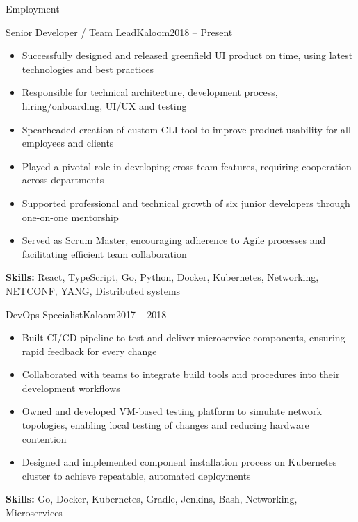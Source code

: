 \documentclass[]{cv}
\begin{document}
	\makeheader

	\begin{cvsection}{Employment}
		\begin{cvsubsection}{Senior Developer / Team Lead}{Kaloom}{2018 -- Present}
			\begin{itemize}
				\item Successfully designed and released greenfield UI product on time, using latest technologies and best practices
				\item Responsible for technical architecture, development process, hiring/onboarding, UI/UX and testing
				\item Spearheaded creation of custom CLI tool to improve product usability for all employees and clients
				\item Played a pivotal role in developing cross-team features, requiring cooperation across departments
				\item Supported professional and technical growth of six junior developers through one-on-one mentorship
				\item Served as Scrum Master, encouraging adherence to Agile processes and facilitating efficient team collaboration
			\end{itemize}
			\small{\textbf{Skills:} React, TypeScript, Go, Python, Docker, Kubernetes, Networking, NETCONF, YANG, Distributed systems}
		\end{cvsubsection}

		\begin{cvsubsection}{DevOps Specialist}{Kaloom}{2017 -- 2018}
			\begin{itemize}
				\item Built CI/CD pipeline to test and deliver microservice components, ensuring rapid feedback for every change
				\item Collaborated with teams to integrate build tools and procedures into their development workflows
				\item Owned and developed VM-based testing platform to simulate network topologies, enabling local testing of changes and reducing hardware contention
				\item Designed and implemented component installation process on Kubernetes cluster to achieve repeatable, automated deployments
			\end{itemize}
			\small{\textbf{Skills:} Go, Docker, Kubernetes, Gradle, Jenkins, Bash, Networking, Microservices}
		\end{cvsubsection}


\end{cvsection}
\end{document}
